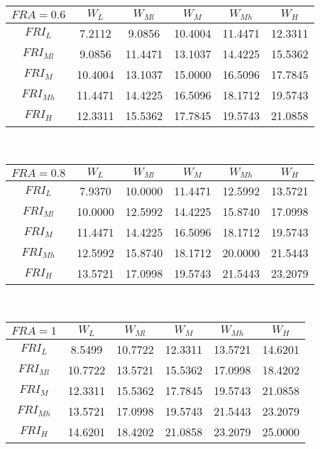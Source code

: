 \begin{table}[h]
    	
    	\begin{tabular}{|c||c|c|c|c|c|}
    		\hline
    		$FRA=0.6$	 &$W_L$&$W_{Ml}$&$W_M$&$W_{Mh}$&$W_H$\\
    		\hline  
    		\hline  
    		$FRI_L$&	7.2112 &   9.0856 &  10.4004 &  11.4471 &  12.3311\\
    		$FRI_{Ml}$&	9.0856  & 11.4471 & 13.1037 &  14.4225  & 15.5362\\
    		$FRI_M$&	10.4004  & 13.1037 &  15.0000 &  16.5096 &  17.7845\\
    		$FRI_{Mh}$&	11.4471  & 14.4225 &  16.5096 &  18.1712 &  19.5743\\
    		$FRI_H$&	12.3311  & 15.5362 &  17.7845 &  19.5743 &  21.0858\\
    		\hline 
    	\end{tabular} \bigskip
    	\\
    	
    	
    	\begin{tabular}{|c||c|c|c|c|c|}
    		\hline
    		$FRA=0.8$	 &$W_L$&$W_{Ml}$&$W_M$&$W_{Mh}$&$W_H$\\
			\hline  
    		\hline  
    		$FRI_L$&7.9370  & 10.0000 &  11.4471  & 12.5992  & 13.5721\\
    		$FRI_{Ml}$&10.0000 &  12.5992 &  14.4225 &  15.8740 &  17.0998\\
    		$FRI_M$&11.4471 &  14.4225 &  16.5096 &  18.1712 &  19.5743\\
    		$FRI_{Mh}$&12.5992 &  15.8740 &  18.1712 &  20.0000 &  21.5443\\
    		$FRI_H$&13.5721 &  17.0998 &  19.5743 &  21.5443 &  23.2079\\
    		\hline 
    	\end{tabular} 
    	\bigskip
    	\\
    	\pagebreak
    	\begin{tabular}{|c||c|c|c|c|c|}
    		\hline
    		$FRA=1$	 &$W_L$&$W_{Ml}$&$W_M$&$W_{Mh}$&$W_H$\\
    		\hline  
    		\hline  
    		$FRI_L$&8.5499  & 10.7722 &  12.3311  & 13.5721 &  14.6201\\
    		$FRI_{Ml}$&10.7722 &  13.5721 &  15.5362 &  17.0998 &  18.4202\\
    		$FRI_M$&12.3311 & 15.5362  & 17.7845  & 19.5743  & 21.0858\\
    		$FRI_{Mh}$&13.5721 &  17.0998 &  19.5743 &  21.5443 &  23.2079\\
    		$FRI_H$&14.6201 &  18.4202 &  21.0858 &  23.2079 &  25.0000\\
    		\hline 
    	\end{tabular} 
    	\bigskip
    	\\
    \end{table}

